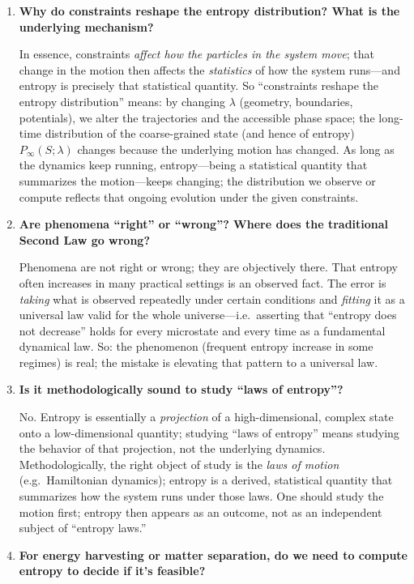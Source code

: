 \documentclass[11pt,a4paper]{article}
\begin{document}
\begin{enumerate}[leftmargin=*]
\item \textbf{Why do constraints reshape the entropy distribution? What is the underlying mechanism?}

In essence, constraints \emph{affect how the particles in the system move}; that change in the motion then affects the \emph{statistics} of how the system runs---and entropy is precisely that statistical quantity. So ``constraints reshape the entropy distribution'' means: by changing $\lambda$ (geometry, boundaries, potentials), we alter the trajectories and the accessible phase space; the long-time distribution of the coarse-grained state (and hence of entropy) $P_{\infty}(S;\lambda)$ changes because the underlying motion has changed. As long as the dynamics keep running, entropy---being a statistical quantity that summarizes the motion---keeps changing; the distribution we observe or compute reflects that ongoing evolution under the given constraints.

\item \textbf{Are phenomena ``right'' or ``wrong''? Where does the traditional Second Law go wrong?}

Phenomena are not right or wrong; they are objectively there. That entropy often increases in many practical settings is an observed fact. The error is \emph{taking} what is observed repeatedly under certain conditions and \emph{fitting} it as a universal law valid for the whole universe---i.e.\ asserting that ``entropy does not decrease'' holds for every microstate and every time as a fundamental dynamical law. So: the phenomenon (frequent entropy increase in some regimes) is real; the mistake is elevating that pattern to a universal law.

\item \textbf{Is it methodologically sound to study ``laws of entropy''?}

No. Entropy is essentially a \emph{projection} of a high-dimensional, complex state onto a low-dimensional quantity; studying ``laws of entropy'' means studying the behavior of that projection, not the underlying dynamics. Methodologically, the right object of study is the \emph{laws of motion} (e.g.\ Hamiltonian dynamics); entropy is a derived, statistical quantity that summarizes how the system runs under those laws. One should study the motion first; entropy then appears as an outcome, not as an independent subject of ``entropy laws.''

\item \textbf{For energy harvesting or matter separation, do we need to compute entropy to decide if it's feasible?}


\end{enumerate}
\end{document}

